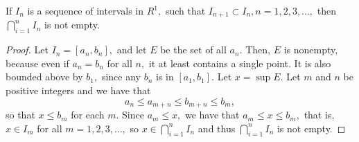 \documentclass{article}
\begin{document}
\begin{theorem}\label{intersection-of-sequence-of-nested-intervals-is-nonempty}
If ${I_n}$ is a \@{sequence} of \@{intervals} in $R^1,$ such that $I_{n+1} \subset I_n, n = 1,2,3,...,$ then $\bigcap_{i=1}^n I_n$ is not empty.
\end{theorem}
\begin{proof}
Let $I_n = [a_n, b_n],$ and let $E$ be the set of all $a_n.$ Then, $E$ is nonempty, because even if $a_n = b_n$ for all $n,$ it at least contains a single point. It is also bounded above by $b_1,$ since any $b_n$ is in $[a_1, b_1].$ Let $x = \sup E.$ Let $m$ and $n$ be positive integers and we have that
\[ a_n \leq a_{m+n} \leq b_{m+n} \leq b_m, \]
so that $x \leq b_m$ for each $m.$ Since $a_m \leq x,$ we have that $a_m \leq x \leq b_m,$ that is, $x \in I_m$ for all $m = 1, 2, 3, \dots,$ so $x \in \bigcap_{i=1}^n I_n$ and thus $\bigcap_{i=1}^n I_n$ is not empty.
\end{proof}
\end{document}
